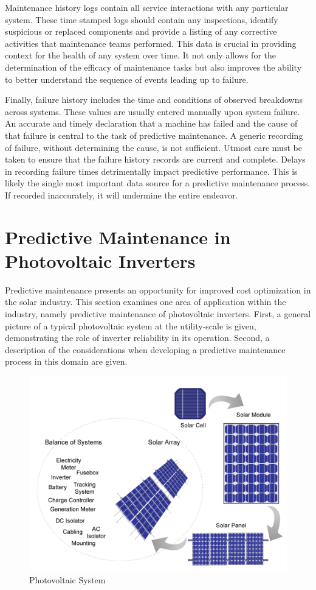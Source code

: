 Maintenance history logs contain all service interactions with any particular system. These time stamped logs should contain any inspections, identify suspicious or replaced components and provide a listing of any corrective activities that maintenance teams performed. This data is crucial in providing context for the health of any system over time. It not only allows for the determination of the efficacy of maintenance tasks but also improves the ability to better understand the sequence of events leading up to failure.

Finally, failure history includes the time and conditions of observed breakdowns across systems. These values are usually entered manually upon system failure. An accurate and timely declaration that a machine has failed and the cause of that failure is central to the task of predictive maintenance. A generic recording of failure, without determining the cause, is not sufficient. Utmost care must be taken to ensure that the failure history records are current and complete. Delays in recording failure times detrimentally impact predictive performance. This is likely the single most important data source for a predictive maintenance process. If recorded inaccurately, it will undermine the entire endeavor. 

\section*{Predictive Maintenance in Photovoltaic Inverters}


Predictive maintenance presents an opportunity for improved cost optimization in the solar industry. This section examines one area of application within the industry, namely predictive maintenance of photovoltaic inverters. First, a general picture of a typical photovoltaic system at the utility-scale is given, demonstrating the role of inverter reliability in its operation. Second, a description of the considerations when developing a predictive maintenance process in this domain are given. 


\begin{figure}[ht!]
\centering
\includegraphics[width=350pt]{img/photovoltaic_system.png}
\caption{Photovoltaic System}
\label{pv_system}
\end{figure}

